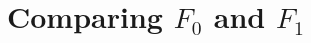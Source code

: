 \documentclass[eikonal.tex]{subfiles}
\begin{document}
\section{Comparing $F_0$ and $F_1$}
\end{document}
